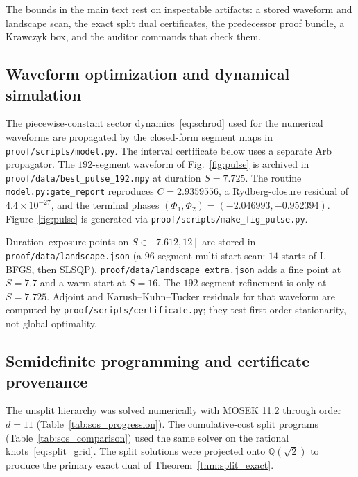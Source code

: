 \documentclass[aps,prx,reprint,nofootinbib,longbibliography,floatfix]{revtex4-2}
\theoremstyle{plain}
\theoremstyle{remark}
\newcommand{\fp}{/\allowbreak}
\begin{document}
\begin{sloppypar}
The bounds in the main text rest on inspectable artifacts: a stored waveform and landscape scan, the exact split dual certificates, the predecessor proof bundle, a Krawczyk box, and the auditor commands that check them.

\subsection{Waveform optimization and dynamical simulation}
The piecewise-constant sector dynamics~\eqref{eq:schrod} used for the numerical waveforms are propagated by the closed-form segment maps in \texttt{proof\fp scripts\fp model.py}. The interval certificate below uses a separate Arb propagator. The $192$-segment waveform of Fig.~\ref{fig:pulse} is archived in \texttt{proof\fp data\fp best\_pulse\_192.npy} at duration $S=7.725$. The routine \texttt{model.py:gate\_report} reproduces $C=2.9359556$, a Rydberg-closure residual of $4.4\times10^{-27}$, and the terminal phases $(\Phi_1,\Phi_2)=(-2.046993,-0.952394)$. Figure~\ref{fig:pulse} is generated via \texttt{proof\fp scripts\fp make\_fig\_pulse.py}.

Duration--exposure points on $S\in[7.612,12]$ are stored in \texttt{proof\fp data\fp landscape.json} (a $96$-segment multi-start scan: $14$ starts of L-BFGS, then SLSQP). \texttt{proof\fp data\fp landscape\_extra.json} adds a fine point at $S=7.7$ and a warm start at $S=16$. The $192$-segment refinement is only at $S=7.725$. Adjoint and Karush--Kuhn--Tucker residuals for that waveform are computed by \texttt{proof\fp scripts\fp certificate.py}; they test first-order stationarity, not global optimality.

\subsection{Semidefinite programming and certificate provenance}
The unsplit hierarchy was solved numerically with MOSEK 11.2 through order $d=11$ (Table~\ref{tab:sos_progression}). The cumulative-cost split programs (Table~\ref{tab:sos_comparison}) used the same solver on the rational knots~\eqref{eq:split_grid}. The split solutions were projected onto $\mathbb Q(\sqrt2)$ to produce the primary exact dual of Theorem~\ref{thm:split_exact}.


\end{sloppypar}
\end{document}
